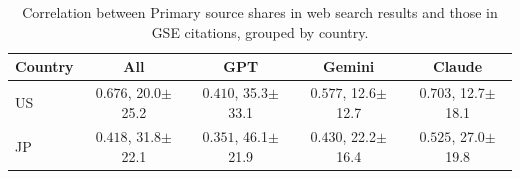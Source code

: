 \begin{table}[t]
\centering
\footnotesize
\setlength{\tabcolsep}{2.2pt}
\caption{Correlation between Primary source shares in web search results and those in GSE citations, grouped by country.}
\label{tab:brave-citation-barrier-correlation}
\begin{tabular}{lcccc}
\toprule
\textbf{Country} & \textbf{All} & \textbf{GPT} & \textbf{Gemini} & \textbf{Claude} \\
\midrule
US & \textcolor{red!70!black}{$0.676$}, 20.0$\pm$25.2 & \textcolor{red!50!black}{$0.410$}, 35.3$\pm$33.1 & \textcolor{red!70!black}{$0.577$}, 12.6$\pm$12.7 & \textcolor{red!90!black}{$0.703$}, 12.7$\pm$18.1 \\
JP & \textcolor{red!50!black}{$0.418$}, 31.8$\pm$22.1 & \textcolor{red!50!black}{$0.351$}, 46.1$\pm$21.9 & \textcolor{red!50!black}{$0.430$}, 22.2$\pm$16.4 & \textcolor{red!70!black}{$0.525$}, 27.0$\pm$19.8 \\
\bottomrule
\end{tabular}
\end{table}
